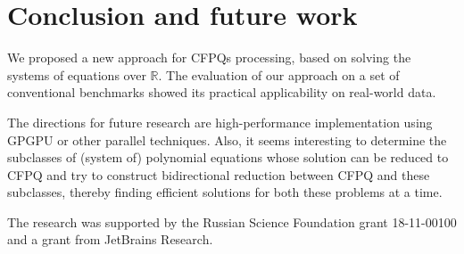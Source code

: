\documentclass[sigconf]{acmart}
\begin{document}
\section{Conclusion and future work}

We proposed a new approach for CFPQs processing, based on solving the systems of equations over $\mathbb{R}$.
The evaluation of our approach on a set of conventional benchmarks showed its practical applicability on real-world data.

The directions for future research are high-performance implementation using GPGPU or other parallel techniques. 
Also, it seems interesting to determine the subclasses of (system of) polynomial equations whose solution can be reduced to CFPQ and try to construct bidirectional reduction between CFPQ and these subclasses, thereby finding efficient solutions for both these problems at a time.



\begin{acks}
The research was supported by the Russian Science Foundation grant 18-11-00100 and a grant from JetBrains Research.
\end{acks}




\end{document}
